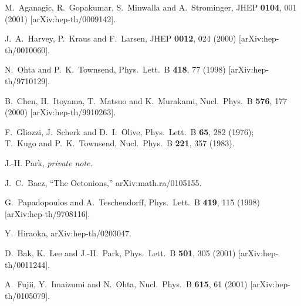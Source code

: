 \documentclass[a4paper,11pt]{article}
\begin{document}
\begin{thebibliography}{99}
M.~Aganagic, R.~Gopakumar, S.~Minwalla and A.~Strominger,
JHEP {\bf 0104}, 001 (2001)
[arXiv:hep-th/0009142].


J.~A.~Harvey, P.~Kraus and F.~Larsen,
JHEP {\bf 0012}, 024 (2000)
[arXiv:hep-th/0010060].




N.~Ohta and P.~K.~Townsend,
Phys.\ Lett.\ B {\bf 418}, 77 (1998) [arXiv:hep-th/9710129].



B.~Chen, H.~Itoyama, T.~Matsuo and K.~Murakami,
Nucl.\ Phys.\ B {\bf 576}, 177 (2000) [arXiv:hep-th/9910263].




F.~Gliozzi, J.~Scherk and D.~I.~Olive,
Phys.\ Lett.\ B {\bf 65}, 282 (1976);\\
T.~Kugo and P.~K.~Townsend,
Nucl.\ Phys.\ B {\bf 221}, 357 (1983).




J.-H. Park, {\it private note}.



J.~C.~Baez, ``The Octonions,'' arXiv:math.ra/0105155.


G.~Papadopoulos and A.~Teschendorff,
Phys.\ Lett.\ B {\bf 419}, 115 (1998) [arXiv:hep-th/9708116].

Y.~Hiraoka,
arXiv:hep-th/0203047.




D.~Bak, K.~Lee and J.-H.~Park,
Phys.\ Lett.\ B {\bf 501}, 305 (2001) [arXiv:hep-th/0011244].



A.~Fujii, Y.~Imaizumi and N.~Ohta,
Nucl.\ Phys.\ B {\bf 615}, 61 (2001) [arXiv:hep-th/0105079].








\end{thebibliography}
\end{document}
